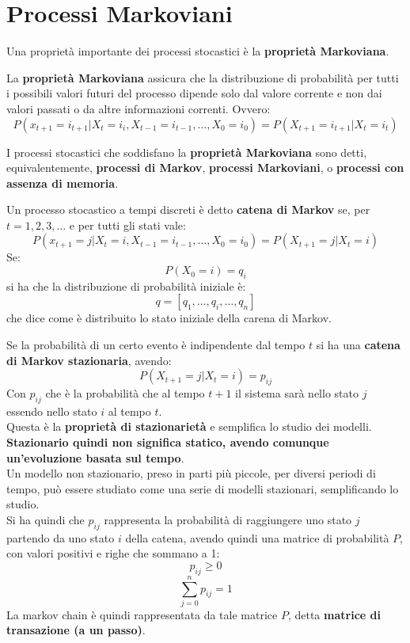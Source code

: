 \message{ !name(modprob.tex)}\documentclass[a4paper,12pt, oneside]{book}
\begin{document}
\section{Processi Markoviani}
Una proprietà importante dei processi stocastici è la \textbf{proprietà
  Markoviana}.
\begin{definizione}
  La \textbf{proprietà Markoviana} assicura che la distribuzione di probabilità
  per tutti i possibili valori futuri del processo dipende solo dal valore
  corrente e non dai valori passati o da altre informazioni correnti. Ovvero:
  \[P(x_{t+1}=i_{t+1}|X_t=i_i, X_{t-1}=i_{t-1},\ldots,
    X_0=i_0)=P(X_{t+1}=i_{t+1}|X_t=i_t)\] 
\end{definizione}
\begin{definizione}
  I processi stocastici che soddisfano la \textbf{proprietà Markoviana} sono
  detti, equivalentemente, \textbf{processi di Markov}, \textbf{processi
    Markoviani}, o \textbf{processi con assenza di memoria}. 
\end{definizione}
\begin{definizione}
  Un processo stocastico a tempi discreti è detto \textbf{catena di Markov} se,
  per $t=1,2,3,\ldots$ e per tutti gli stati vale:
  \[P(x_{t+1}=j|X_t=i, X_{t-1}=i_{t-1},\ldots,
    X_0=i_0)=P(X_{t+1}=j|X_t=i)\]
  Se:
  \[P(X_0=i)=q_i\]
  si ha che la distribuzione di probabilità iniziale è:
  \[q=[q_1,\ldots, q_i,\ldots, q_n]\]
  che dice come è distribuito lo stato iniziale della carena di Markov.
\end{definizione}
\begin{definizione}
  Se la probabilità di un certo evento è indipendente dal tempo $t$ si ha una
  \textbf{catena di Markov stazionaria}, avendo:
  \[P(X_{t+1}=j|X_t=i)=p_{ij}\]
  Con $p_{ij}$ che è la probabilità che al tempo $t+1$ il sistema sarà nello
  stato $j$ essendo nello stato $i$ al tempo $t$.\\
  Questa è la \textbf{proprietà di stazionarietà} e semplifica lo studio dei
  modelli. 
  \textbf{Stazionario quindi non significa statico, avendo comunque
    un'evoluzione basata sul tempo}.\\
  Un modello non stazionario, preso in parti più piccole, per diversi periodi di
  tempo, può essere studiato come una serie di modelli stazionari,
  semplificando lo studio. \\
  Si ha quindi che $p_{ij}$ rappresenta la probabilità di raggiungere uno stato
  $j$ partendo da uno stato $i$ della catena, avendo quindi una matrice di
  probabilità $P$, con valori positivi e righe che sommano a 1:
  \[p_{ij}\geq 0\]
  \[\sum_{j=0}^n p_{ij}=1\]
  La markov chain è quindi rappresentata da tale matrice $P$, detta
  \textbf{matrice di transazione (a un passo)}.
\end{definizione}
\end{document}
